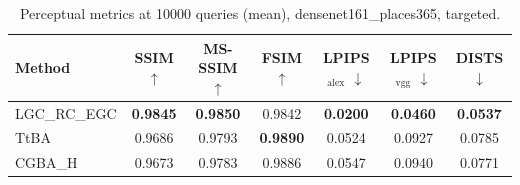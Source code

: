 \begin{table}[t]
\centering\footnotesize
\caption{Perceptual metrics at 10000 queries (mean), densenet161\_places365, targeted.}
\begin{tabular}{lcccccc}
\toprule
Method & SSIM $\uparrow$ & MS-SSIM $\uparrow$ & FSIM $\uparrow$ & LPIPS$_{\mathrm{alex}}$ $\downarrow$ & LPIPS$_{\mathrm{vgg}}$ $\downarrow$ & DISTS $\downarrow$ \\
\midrule
LGC\_RC\_EGC & \textbf{0.9845} & \textbf{0.9850} & 0.9842 & \textbf{0.0200} & \textbf{0.0460} & \textbf{0.0537} \\
TtBA & 0.9686 & 0.9793 & \textbf{0.9890} & 0.0524 & 0.0927 & 0.0785 \\
CGBA\_H & 0.9673 & 0.9783 & 0.9886 & 0.0547 & 0.0940 & 0.0771 \\
\bottomrule
\end{tabular}
\end{table}
